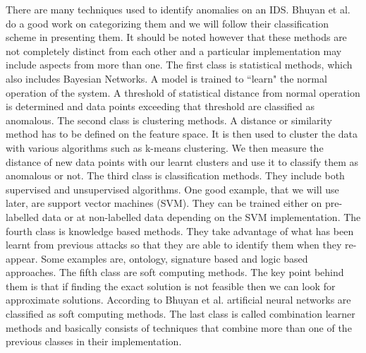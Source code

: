 \documentclass[reqno,openany,12pt]{amsbook}
\begin{document}
There are many techniques used to identify anomalies on an IDS. Bhuyan et al.\cite{ids1} do a good work on categorizing them and we will follow their classification scheme in presenting them. It should be noted however that these methods are not completely distinct from each other and a particular implementation may include aspects from more than one.
The first class is statistical methods,
which also includes Bayesian Networks. A model is trained to ``learn" the normal operation of the system. A threshold of statistical distance from normal operation is determined and data points exceeding that threshold are classified as anomalous.
The second class is clustering methods.
A distance or similarity method has to be defined on the feature space. It is then used to cluster the data with various algorithms such as k-means clustering. We then measure the distance of new data points with our learnt clusters
and use it to classify them as anomalous or not.
The third class is classification methods.
They include both supervised and unsupervised algorithms. One good example, that we will use later, are support vector machines (SVM). They can be trained either on pre-labelled data or at non-labelled data depending on the SVM implementation.
The fourth class is knowledge based methods.
They take advantage of what has been learnt from previous attacks so that they are able to identify them when they re-appear. Some examples are, ontology, signature based and logic based approaches.
The fifth class are soft computing methods.
The key point behind them is that if finding the exact solution is not feasible then we can look for approximate solutions. According to Bhuyan et al.\cite{ids1} artificial neural networks are classified as soft computing methods.
The last class is called combination learner methods and basically consists of techniques that combine more than one of the previous classes in their implementation.
\end{document}
